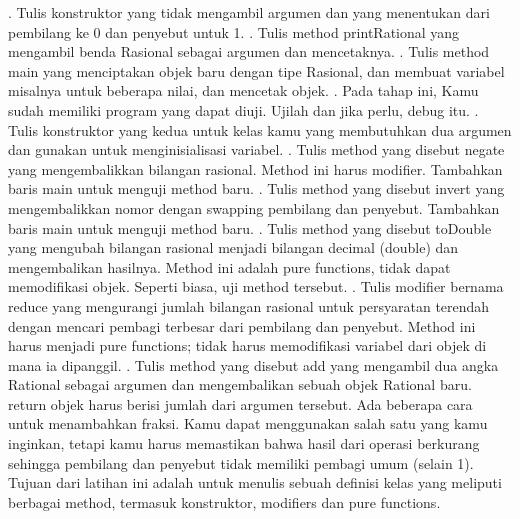 \newline {}. Tulis konstruktor yang tidak mengambil argumen dan yang menentukan dari pembilang ke 0 dan penyebut untuk 1.
\newline {}. Tulis method printRational yang mengambil benda Rasional sebagai argumen dan mencetaknya.
\newline {}. Tulis method main yang menciptakan objek baru dengan tipe Rasional, dan membuat variabel misalnya untuk beberapa nilai, dan mencetak objek.
\newline {}. Pada tahap ini, Kamu sudah memiliki program yang dapat diuji. Ujilah dan jika perlu, debug itu.
\newline {}. Tulis konstruktor yang kedua untuk kelas kamu yang membutuhkan dua argumen dan gunakan untuk menginisialisasi variabel.
\newline {}. Tulis method yang disebut negate yang mengembalikkan bilangan rasional. Method ini harus modifier. Tambahkan baris main untuk menguji method baru. 
\newline {}. Tulis method yang disebut invert yang mengembalikkan nomor dengan swapping pembilang dan penyebut. Tambahkan baris main untuk menguji method baru.
\newline {}. Tulis method yang disebut toDouble yang mengubah bilangan rasional menjadi bilangan decimal (double) dan mengembalikan hasilnya. Method ini adalah pure functions, tidak dapat memodifikasi objek. Seperti biasa, uji method tersebut.
\newline {}. Tulis modifier bernama reduce yang mengurangi jumlah bilangan rasional untuk persyaratan terendah dengan mencari pembagi terbesar dari pembilang dan penyebut. Method ini harus menjadi pure functions; tidak harus memodifikasi variabel  dari objek di mana ia dipanggil.
\newline {}. Tulis method yang disebut add yang mengambil dua angka Rational sebagai argumen dan mengembalikan sebuah objek Rational baru. return objek harus berisi jumlah dari argumen tersebut.
\newline \newline
Ada beberapa cara untuk menambahkan fraksi. Kamu dapat menggunakan salah satu yang kamu inginkan, tetapi kamu harus memastikan bahwa hasil dari operasi berkurang sehingga pembilang dan penyebut tidak memiliki pembagi umum (selain 1).
\newline \newline
Tujuan dari latihan ini adalah untuk menulis sebuah definisi kelas yang meliputi berbagai method, termasuk konstruktor, modifiers dan pure functions.